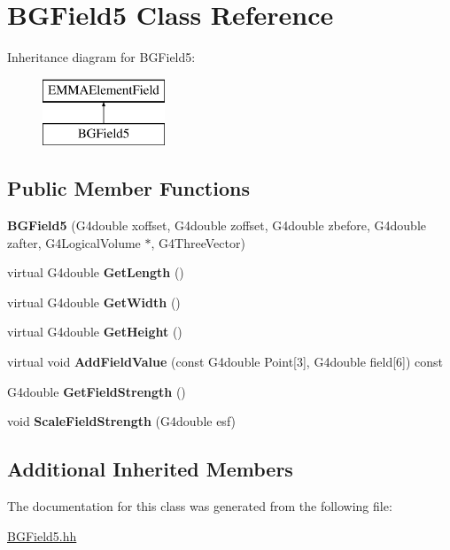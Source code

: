 \hypertarget{classBGField5}{\section{B\-G\-Field5 Class Reference}
\label{classBGField5}
}
Inheritance diagram for B\-G\-Field5\-:\begin{figure}[H]
\begin{center}
\leavevmode
\includegraphics[height=2.000000cm]{classBGField5}
\end{center}
\end{figure}
\subsection*{Public Member Functions}
\begin{DoxyCompactItemize}
\item 
\hypertarget{classBGField5_afe5dd17ba8949f419920c47952dbe10b}{{\bfseries B\-G\-Field5} (G4double xoffset, G4double zoffset, G4double zbefore, G4double zafter, G4\-Logical\-Volume $\ast$, G4\-Three\-Vector)}\label{classBGField5_afe5dd17ba8949f419920c47952dbe10b}

\item 
\hypertarget{classBGField5_aa003bda3eb139d5c6f1bddbbc7ee9a3f}{virtual G4double {\bfseries Get\-Length} ()}\label{classBGField5_aa003bda3eb139d5c6f1bddbbc7ee9a3f}

\item 
\hypertarget{classBGField5_aca250c0313214b8ca38d47df1e1a45d2}{virtual G4double {\bfseries Get\-Width} ()}\label{classBGField5_aca250c0313214b8ca38d47df1e1a45d2}

\item 
\hypertarget{classBGField5_ab9cdd6f73808a2e8cfc1ad14bc0ee4bb}{virtual G4double {\bfseries Get\-Height} ()}\label{classBGField5_ab9cdd6f73808a2e8cfc1ad14bc0ee4bb}

\item 
\hypertarget{classBGField5_a85ddce900e965338562cd7d6b28eb08d}{virtual void {\bfseries Add\-Field\-Value} (const G4double Point\mbox{[}3\mbox{]}, G4double field\mbox{[}6\mbox{]}) const }\label{classBGField5_a85ddce900e965338562cd7d6b28eb08d}

\item 
\hypertarget{classBGField5_a7fcafffe48960675096f1693203ae437}{G4double {\bfseries Get\-Field\-Strength} ()}\label{classBGField5_a7fcafffe48960675096f1693203ae437}

\item 
\hypertarget{classBGField5_a3298d0794e6914bfebe6550a6b08ee26}{void {\bfseries Scale\-Field\-Strength} (G4double esf)}\label{classBGField5_a3298d0794e6914bfebe6550a6b08ee26}

\end{DoxyCompactItemize}
\subsection*{Additional Inherited Members}


The documentation for this class was generated from the following file\-:\begin{DoxyCompactItemize}
\item 
\hyperlink{BGField5_8hh}{B\-G\-Field5.\-hh}\end{DoxyCompactItemize}
